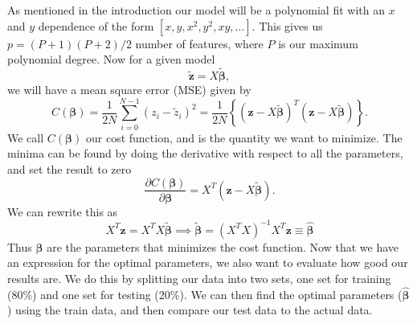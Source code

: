 \documentclass[reprint,english,notitlepage,aps,nobalancelastpage,nofootinbib]{revtex4-1}  %
\newcommand{\vc}[1]{\mathbf{#1}}
\begin{document}
As mentioned in the introduction our model will be a polynomial fit with an $x$ and $y$ dependence of the form $[x,y,x^2,y^2,xy,\dots]$. This gives us $p = (P + 1)(P + 2)/2$ number of features, where $P$ is our maximum polynomial degree. Now for a given model
\begin{equation*}
	\boldsymbol{\tilde{z}} = X\boldsymbol{\tilde{\beta}},
\end{equation*}
we will have a mean square error (MSE) given by
\begin{equation*}
	C(\boldsymbol{\beta}) = \frac{1}{2N}\sum_{i=0}^{N-1} (z_i - \tilde{z}_i)^2 = \frac{1}{2N}\left\{(\vc{z} - X\boldsymbol{\tilde{\beta}})^T(\vc{z} - X\boldsymbol{\tilde{\beta}})\right\}.
\end{equation*}
We call $C(\boldsymbol{\beta})$ our cost function, and is the quantity we want to minimize. The minima can be found by doing the derivative with respect to all the parameters, and set the result to zero
\begin{equation*}
	\frac{\partial C(\boldsymbol{\beta})}{\partial \boldsymbol{\beta}} = X^T(\boldsymbol{z} - X\boldsymbol{\tilde{\beta}}).
\end{equation*}
We can rewrite this as
\begin{equation*}
	X^T\vc{z} = X^TX\boldsymbol{\tilde{\beta}} \implies \boldsymbol{\tilde{\beta}} = (X^TX)^{-1} X^T \vc{z} \equiv \boldsymbol{\hat{\beta}}
\end{equation*}
Thus $\boldsymbol{\hat{\beta}}$ are the parameters that minimizes the cost function. Now that we have an expression for the optimal parameters, we also want to evaluate how good our results are. We do this by splitting our data into two sets, one set for training (80\%) and one set for testing (20\%). We can then find the optimal parameters ($\boldsymbol{\hat{\beta}}$) using the train data, and then compare our test data to the actual data.
\end{document}
